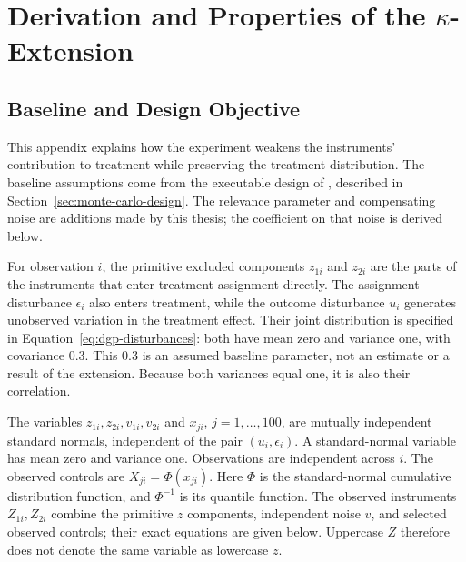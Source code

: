 \section{Derivation and Properties of the \texorpdfstring{\(\kappa\)}{κ}-Extension}
\label{app:kappa-derivation}

\subsection{Baseline and Design Objective}

This appendix explains how the experiment weakens the instruments' contribution to treatment while preserving the treatment distribution. The baseline assumptions come from the executable design of \textcite{chen_huang_tien_2021}, described in Section~\ref{sec:monte-carlo-design}. The relevance parameter and compensating noise are additions made by this thesis; the coefficient on that noise is derived below.

For observation $i$, the primitive excluded components $z_{1i}$ and $z_{2i}$ are the parts of the instruments that enter treatment assignment directly. The assignment disturbance $\epsilon_i$ also enters treatment, while the outcome disturbance $u_i$ generates unobserved variation in the treatment effect. Their joint distribution is specified in Equation~\eqref{eq:dgp-disturbances}: both have mean zero and variance one, with covariance 0.3. This 0.3 is an assumed baseline parameter, not an estimate or a result of the extension. Because both variances equal one, it is also their correlation.

The variables $z_{1i},z_{2i},v_{1i},v_{2i}$ and $x_{ji}$, $j=1,\ldots,100$, are mutually independent standard normals, independent of the pair $(u_i,\epsilon_i)$. A standard-normal variable has mean zero and variance one. Observations are independent across $i$. The observed controls are $X_{ji}=\Phi(x_{ji})$. Here $\Phi$ is the standard-normal cumulative distribution function, and $\Phi^{-1}$ is its quantile function. The observed instruments $Z_{1i},Z_{2i}$ combine the primitive $z$ components, independent noise $v$, and selected observed controls; their exact equations are given below. Uppercase $Z$ therefore does not denote the same variable as lowercase $z$.

